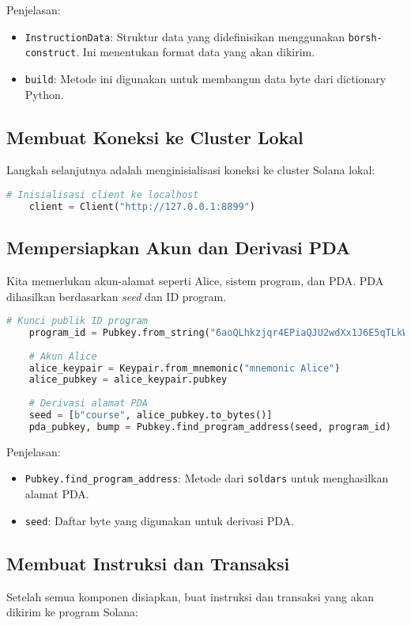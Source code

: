 Penjelasan:
\begin{itemize}
	\item \texttt{InstructionData}: Struktur data yang didefinisikan menggunakan \texttt{borsh-construct}. Ini menentukan format data yang akan dikirim.
	\item \texttt{build}: Metode ini digunakan untuk membangun data byte dari dictionary Python.
\end{itemize}

\subsection{Membuat Koneksi ke Cluster Lokal}
Langkah selanjutnya adalah menginisialisasi koneksi ke cluster Solana lokal:

\begin{lstlisting}[language=Python]
	# Inisialisasi client ke localhost
	client = Client("http://127.0.0.1:8899")
\end{lstlisting}

\subsection{Mempersiapkan Akun dan Derivasi PDA}
Kita memerlukan akun-alamat seperti Alice, sistem program, dan PDA. PDA dihasilkan berdasarkan \textit{seed} dan ID program.

\begin{lstlisting}[language=Python]
	# Kunci publik ID program
	program_id = Pubkey.from_string("6aoQLhkzjqr4EPiaQJU2wdXx1J6E5qTLkWkqkFyaNiLo")
	
	# Akun Alice
	alice_keypair = Keypair.from_mnemonic("mnemonic Alice")
	alice_pubkey = alice_keypair.pubkey
	
	# Derivasi alamat PDA
	seed = [b"course", alice_pubkey.to_bytes()]
	pda_pubkey, bump = Pubkey.find_program_address(seed, program_id)
\end{lstlisting}

Penjelasan:
\begin{itemize}
	\item \texttt{Pubkey.find\_program\_address}: Metode dari \texttt{soldars} untuk menghasilkan alamat PDA.
	\item \texttt{seed}: Daftar byte yang digunakan untuk derivasi PDA.
\end{itemize}

\subsection{Membuat Instruksi dan Transaksi}
Setelah semua komponen disiapkan, buat instruksi dan transaksi yang akan dikirim ke program Solana:

